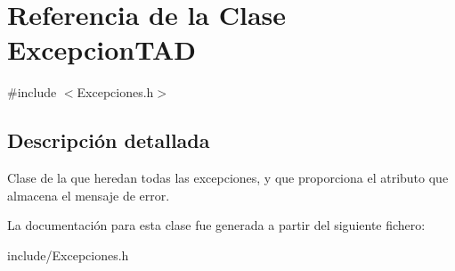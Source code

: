 \hypertarget{class_excepcion_t_a_d}{
\section{\-Referencia de la \-Clase \-Excepcion\-T\-A\-D}
\label{class_excepcion_t_a_d}
}


{\ttfamily \#include $<$\-Excepciones.\-h$>$}



\subsection{\-Descripción detallada}
\-Clase de la que heredan todas las excepciones, y que proporciona el atributo que almacena el mensaje de error. 

\-La documentación para esta clase fue generada a partir del siguiente fichero\-:\begin{DoxyCompactItemize}
\item 
include/\-Excepciones.\-h\end{DoxyCompactItemize}
